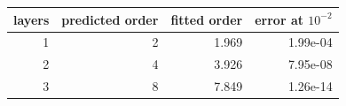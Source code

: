 \begin{tabular}{rrrr}
\toprule
layers & predicted order & fitted order & error at $10^{-2}$ \\
\midrule
1 & 2 & 1.969 & 1.99e-04 \\
2 & 4 & 3.926 & 7.95e-08 \\
3 & 8 & 7.849 & 1.26e-14 \\
\bottomrule
\end{tabular}
